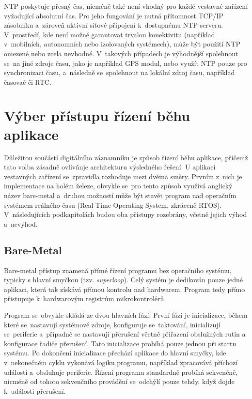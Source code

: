 NTP poskytuje přesný čas, nicméně také není vhodný pro každé vestavné zařízení vyžadující absolutní čas. Pro jeho fungování je nutná přítomnost TCP/IP zásobníku a~zároveň aktivní síťové připojení k~dostupnému NTP serveru. V~prostředí, kde není možné garantovat trvalou konektivitu (například v~mobilních, autonomních nebo izolovaných systémech), může být použití NTP omezené nebo zcela nevhodné. V~takových případech je výhodnější spolehnout se~na jiné zdroje času, jako je například GPS modul, nebo využít NTP pouze pro synchronizaci času, a~následně se~spolehnout na lokální zdroj času, například časovač či RTC.

\section{Výber přístupu řízení běhu aplikace}
Důležitou součástí digitálního záznamníku je způsob řízení běhu aplikace, příčemž tato volba zásadně ovlivňuje architekturu výsledného řešení. U aplikací vestavných zařízení se~zpravidla rozhoduje mezi dvěma směry. Prvním z~nich je implementace na holém železe, obvykle se~pro tento způsob využívá anglický název bare-metal a~druhou možností může být stavět program nad operačním systémem reálného času (Real-Time Operating System, zkráceně RTOS). V~následujících podkapitolách budou oba přístupy rozebrány, včetně jejich výhod a~nevýhod. 

\subsection{Bare-Metal}
Bare-metal přístup znamená přímé řízení programu bez operačního systému, typicky s hlavní smyčkou (tzv. \emph{superloop}). Celý systém je dedikován pouze jedné aplikaci, která tak získává přímou kontrolu nad hardwarem. Program tedy přímo přistupuje k~hardwarovým registrům mikrokontrolérů.~\cite{sysgo_baremetal_vs_rtos}

Program se~obvykle skládá ze dvou hlavních fází. První fází je inicializace, během které se~nastavují systémové zdroje, konfiguruje se~taktování, inicializují se~periferie a~případně se nastavují přerušení včetně přiřazení obslužných rutin a konfigurace řadiče přerušení. Tato inicializace probíhá pouze jednou při startu systému. Po dokončení inicializace přechází aplikace do hlavní smyčky, kde v~nekonečném cyklu vykonává logiku programu, například zpracovává příchozí události a~obsluhuje periferie. Řízení programu standardně probíhá sekvenčně, nicméně od tohoto sekvenčního provádění se~odchýlí pouze tehdy, když dojde k~události přerušení.~\cite{sysgo_baremetal_vs_rtos}

